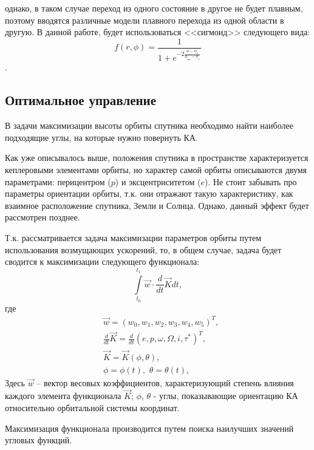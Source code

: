 однако, в таком случае переход из одного состояние в другое не будет плавным, поэтому
вводятся различные модели плавного перехода из одной области в другую. В данной работе,
будет использоваться <<сигмоид>> следующего вида:
\begin{equation}
  f(r, \phi) = \frac{1}{1 + e^{-2\frac{\phi - \phi_{\text{т}}}{\phi_{\text{пт}} - \phi_{\text{т}}}}}
\end{equation}.
\subsection{Оптимальное управление}
\noindent\indent В задачи максимизации высоты орбиты спутника необходимо найти
наиболее подходящие углы, на которые нужно повернуть КА.\par
  Как уже описывалось выше, положения спутника в пространстве характеризуется
кеплеровыми элементами орбиты, но характер самой орбиты описываются двумя параметрами:
перицентром ($p$) и эксцентриситетом ($e$). Не стоит забывать про параметры ориентации
орбиты, т.к. они отражают такую характеристику, как взаимное расположение спутника,
Земли и Солнца. Однако, данный эффект будет рассмотрен позднее.\par
  Т.к. рассматривается задача максимизации параметров орбиты путем использования
возмущающих ускорений, то, в общем случае, задача будет сводится к максимизации
следующего функционала:
\begin{equation} \label{eq:IntMaxFullEq}
  \int\limits_{t_0}^{t_1} \vec{w} \cdot \frac{d}{dt}\vec{K} dt,
\end{equation}
где
\begin{equation}
  \begin{aligned}
    & \vec{w} = (w_0, w_1, w_2, w_3, w_4, w_5)^T, \\
    & \frac{d}{dt}\vec{K} = \frac{d}{dt}(e, p, \omega, \Omega, i, \tau^*)^T, \\
    & \vec{K} = \vec{K}(\phi, \theta), \\
    & \phi = \phi(t),\,\, \theta = \theta(t),
  \end{aligned}
\end{equation}
Здесь $\vec{w}$ -- вектор весовых коэффициентов, характеризующий степень влияния
каждого элемента функционала $\vec{K}$; $\phi$, $\theta$ - углы, показывающие ориентацию
КА относительно орбитальной системы координат.\par
  Максимизация функционала производится путем поиска наилучших значений угловых
функций.
